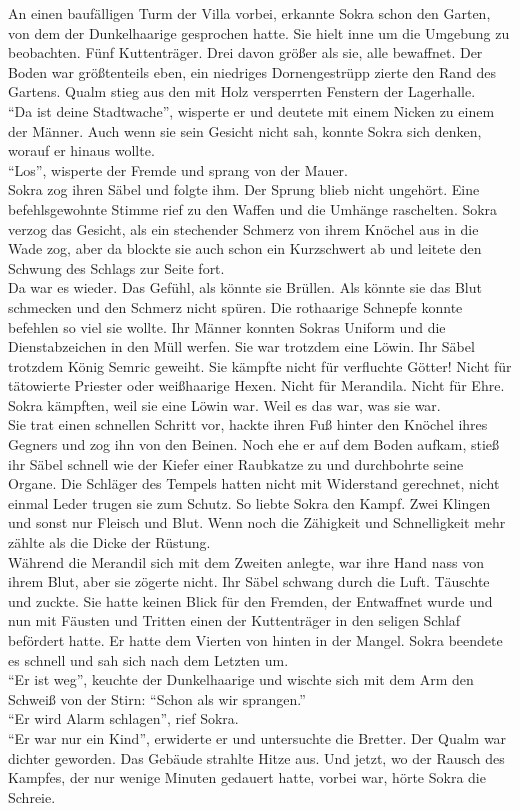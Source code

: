 An einen baufälligen Turm der Villa vorbei, erkannte Sokra schon den Garten, von dem der 
Dunkelhaarige gesprochen hatte. Sie hielt inne um die Umgebung zu beobachten. Fünf Kuttenträger. 
Drei davon größer als sie, alle bewaffnet. Der Boden war größtenteils eben, ein niedriges 
Dornengestrüpp zierte den Rand des Gartens. Qualm stieg aus den mit Holz versperrten Fenstern der 
Lagerhalle.\\
``Da ist deine Stadtwache'', wisperte er und deutete mit einem Nicken zu einem der Männer. Auch 
wenn sie sein Gesicht nicht sah, konnte Sokra sich denken, worauf er hinaus wollte.\\
``Los'', wisperte der Fremde und sprang von der Mauer.\\
Sokra zog ihren Säbel und folgte ihm. Der Sprung blieb nicht ungehört. Eine befehlsgewohnte Stimme 
rief zu den Waffen und die Umhänge raschelten. Sokra verzog das Gesicht, als ein stechender Schmerz 
von ihrem Knöchel aus in die Wade zog, aber da blockte sie auch schon ein Kurzschwert ab und 
leitete den Schwung des Schlags zur Seite fort.\\
Da war es wieder. Das Gefühl, als könnte sie Brüllen. Als könnte sie das Blut schmecken und den 
Schmerz nicht spüren. Die rothaarige Schnepfe konnte befehlen so viel sie wollte. Ihr Männer 
konnten Sokras Uniform und die Dienstabzeichen in den Müll werfen. Sie war trotzdem eine Löwin. Ihr 
Säbel trotzdem König Semric geweiht. Sie kämpfte nicht für verfluchte Götter! Nicht für 
tätowierte Priester oder weißhaarige Hexen. Nicht für Merandila. Nicht für Ehre. Sokra kämpften, 
weil sie eine Löwin war. Weil es das war, was sie war.\\
Sie trat einen schnellen Schritt vor, hackte ihren Fuß hinter den Knöchel ihres Gegners und zog ihn 
von den Beinen. Noch ehe er auf dem Boden aufkam, stieß ihr Säbel schnell wie der Kiefer einer 
Raubkatze zu und durchbohrte seine Organe. Die Schläger des Tempels hatten nicht mit Widerstand 
gerechnet, nicht einmal Leder trugen sie zum Schutz. So liebte Sokra den Kampf. Zwei Klingen und 
sonst nur Fleisch und Blut. Wenn noch die Zähigkeit und Schnelligkeit mehr zählte als die Dicke 
der Rüstung.\\
Während die Merandil sich mit dem Zweiten anlegte, war ihre Hand nass von ihrem Blut, aber sie zögerte 
nicht. Ihr Säbel schwang durch die Luft. Täuschte und zuckte. Sie hatte keinen Blick für den 
Fremden, der Entwaffnet wurde und nun mit Fäusten und Tritten einen der Kuttenträger in den seligen Schlaf befördert hatte. 
Er hatte dem Vierten von hinten in der Mangel. Sokra beendete es schnell und sah sich nach dem 
Letzten um.\\
``Er ist weg'', keuchte der Dunkelhaarige und wischte sich mit dem Arm den Schweiß von der Stirn: 
``Schon als wir sprangen.''\\
``Er wird Alarm schlagen'', rief Sokra.\\
``Er war nur ein Kind'', erwiderte er und untersuchte die Bretter. Der Qualm war dichter geworden. 
Das Gebäude strahlte Hitze aus. Und jetzt, wo der Rausch des Kampfes, der nur wenige Minuten 
gedauert hatte, vorbei war, hörte Sokra die Schreie.\\

